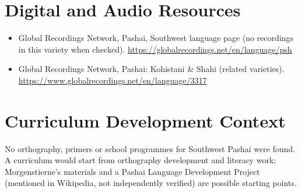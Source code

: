 \documentclass[12pt]{article}
\begin{document}
\section{Digital and Audio Resources}
\begin{itemize}
\item Global Recordings Network, Pashai, Southwest language page (no recordings in this variety when checked). \url{https://globalrecordings.net/en/language/psh}
\item Global Recordings Network, Pashai: Kohistani \& Shahi (related varieties). \url{https://www.globalrecordings.net/en/language/3317}
\end{itemize}

\section{Curriculum Development Context}
No orthography, primers or school programmes for Southwest Pashai were found. A curriculum would start from orthography development and literacy work; Morgenstierne's materials and a Pashai Language Development Project (mentioned in Wikipedia, not independently verified) are possible starting points.
\end{document}
